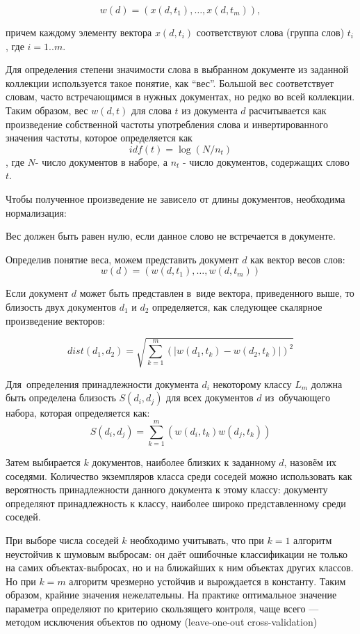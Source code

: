 $$w(d) = (x(d,t_1),\dots, x(d,t_m)),$$ 

причем каждому элементу вектора $x(d, t_i)$ соответствуют слова (группа слов) $t_i$, где $i = 1..m $.

Для определения степени значимости слова в выбранном документе из заданной коллекции
используется такое понятие, как ``вес''. 
Большой вес соответствует словам, часто встречающимся 
в нужных документах, но редко во всей коллекции. 
Таким образом, вес $w(d,t)$ для слова $t$
из документа $d$ расчитывается как произведение собственной частоты употребления слова
и инвертированного значения частоты, которое определяется как $$idf(t) = \log (N/n_t)$$,
где $N$- число документов в наборе, а $n_t$ - число документов, содержащих слово $t$.

Чтобы полученное произведение не зависело от длины документов, необходима нормализация:
  

Вес должен быть равен нулю, если данное слово не встречается в документе.

Определив понятие веса, можем представить документ $d$ как вектор весов слов:
$$w(d) = (w(d,t_1), \dots, w(d,t_m))$$

Если документ $d$ может быть представлен в~виде вектора, приведенного выше, 
то близость двух документов $d_1$ и $d_2$ определяется, как следующее скалярное произведение векторов:

$$dist(d_1,d_2) = \sqrt{\sum \limits_{k=1}^{m}(|w(d_1,t_k)-w(d_2,t_k)|)^2}$$

Для~определения принадлежности документа $d_i$ некоторому классу $L_m$ 
должна быть определена близость $S(d_i,d_j)$ для  всех документов $d$ из~обучающего набора, 
которая определяется как:  
$$S(d_i,d_j)=\sum \limits_{k=1}^{m}(w(d_i,t_k)w(d_j,t_k))$$

Затем выбирается $k$ документов, наиболее близких  к заданному $d$, назовём их соседями. 
Количество экземпляров класса среди соседей можно использовать как вероятность принадлежности данного документа к этому классу: 
документу определяют принадлежность к классу, наиболее широко представленному среди соседей. 

При выборе числа соседей $k$ необходимо учитывать, что при $k = 1$ алгоритм неустойчив к шумовым
выбросам: он даёт ошибочные классификации не только на самих объектах-выбросах, но и на 
ближайших к ним объектах других классов. 
Но при $k = m$ алгоритм чрезмерно устойчив и вырождается 
в константу. Таким образом, крайние значения  нежелательны. На практике оптимальное значение
параметра  определяют по критерию скользящего контроля, чаще всего — методом исключения объектов
по одному (leave-one-out cross-validation) \cite{machinelearning} %

